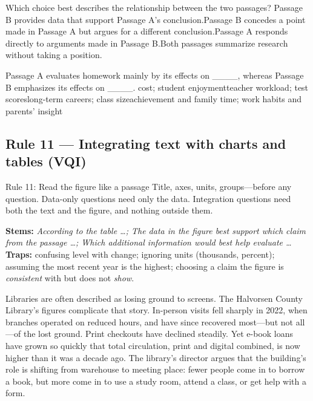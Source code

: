 \documentclass[11pt]{article}
\begin{document}
{Which choice best describes the relationship between the two passages?}
{Passage B provides data that support Passage A's conclusion.}{Passage B concedes a point made in Passage A but argues for a different conclusion.}{Passage A responds directly to arguments made in Passage B.}{Both passages summarize research without taking a position.}

{Passage A evaluates homework mainly by its effects on \_\_\_\_, whereas Passage B emphasizes its effects on \_\_\_\_.}
{cost; student enjoyment}{teacher workload; test scores}{long-term careers; class size}{achievement and family time; work habits and parents' insight}

\subsection{Rule 11 --- Integrating text with charts and tables (VQI)}
\begin{rulebox}{Rule 11: Read the figure like a passage}
Title, axes, units, groups---before any question. Data-only questions need only the data. Integration questions need both the text and the figure, and nothing outside them.
\end{rulebox}
\textbf{Stems:} \emph{According to the table \dots; The data in the figure best support which claim from the passage \dots; Which additional information would best help evaluate \dots}\\
\textbf{Traps:} confusing level with change; ignoring units (thousands, percent); assuming the most recent year is the highest; choosing a claim the figure is \emph{consistent} with but does not \emph{show}.

\begin{passage}
Libraries are often described as losing ground to screens. The Halvorsen County Library's figures complicate that story. In-person visits fell sharply in 2022, when branches operated on reduced hours, and have since recovered most---but not all---of the lost ground. Print checkouts have declined steadily. Yet e-book loans have grown so quickly that total circulation, print and digital combined, is now higher than it was a decade ago. The library's director argues that the building's role is shifting from warehouse to meeting place: fewer people come in to borrow a book, but more come in to use a study room, attend a class, or get help with a form.
\end{passage}
\end{document}
